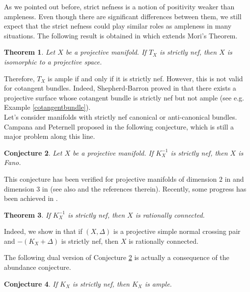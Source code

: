 \documentclass[english,reqno]{amsart}
\theoremstyle{plain}
\newtheorem{thm}{Theorem}[section]
\newtheorem{conj}[thm]{Conjecture}
\theoremstyle{definition}
\numberwithin{equation}{section} %
\begin{document}
As we pointed out before,  strict nefness is a notion of positivity weaker than ampleness.   Even though there are significant differences between them, we still expect that  the strict nefness could play similar roles as ampleness in many  situations. The following result is obtained in \cite[Theorem~1.4]{LiOuYang2019} which extends Mori's Theorem.
\begin{thm} Let $X$ be a projective manifold. If $T_X$ is strictly nef, then $X$ is isomorphic to a projective space.
\end{thm}

\noindent Therefore, $T_X$ is ample if and only if it is strictly nef.  However, this is not valid for cotangent bundles. Indeed, Shepherd-Barron proved in  \cite{ShepherdBarron1995} that there exists a projective surface whose cotangent bundle is strictly nef but not ample (see e.g. Example \ref{cotangentbundle}).\\


Let's consider manifolds with strictly nef canonical or anti-canonical bundles. Campana and Peternell proposed in
\cite[Problem~11.4]{CampanaPeternell1991} the following conjecture, which is still a major problem along this line.

\begin{conj} \label{CampanaPeternellConjecture1} Let $X$ be a  projective
    manifold. If $K_X^{-1}$ is strictly nef, then $X$
    is  Fano.
\end{conj}

\noindent This conjecture has been verified for projective manifolds of dimension $2$ in \cite{Maeda1993} and dimension $3$ in \cite{Serrano1995} (see also \cite{Uehara2000} and the references therein).
Recently, some progress has been achieved in \cite[Theorem~1.2]{LiOuYang2019}.

\begin{thm}\label{LOYrationallyconnected1}  If $K^{-1}_X$ is strictly nef, then $X$ is rationally connected.
\end{thm}

\noindent  Indeed, we show in \cite{LiuOuYang2} that if $(X,\Delta)$ is a projective simple normal crossing pair and $-(K_X+\Delta)$ is strictly nef, then $X$ is rationally connected. 

The following dual version of Conjecture \ref{CampanaPeternellConjecture1} is actually a consequence of the abundance conjecture.

\begin{conj} If $K_X$ is strictly nef, then $K_X$ is ample.
    \end{conj}
\end{document}
